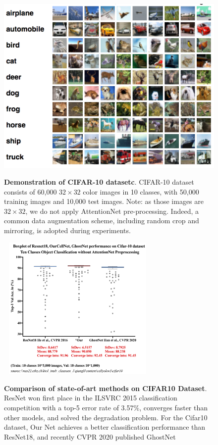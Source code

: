 \begin{figure}[ht]
\begin{center}
\includegraphics[height=0.3\textheight]{thesis-template-master/images/cifardataset.png}
\label{fig:cellnet}
\end{center}
\caption{\textbf{Demonstration of CIFAR-10 datasetc}. CIFAR-10 dataset\cite{21} consists of 60,000  $32 \times 32$ color images in 10 classes, with 50,000 training images and 10,000 test images. Note: as those images are  $32 \times 32$, we do not apply AttentionNet pre-processing. Indeed, a common data augmentation scheme, including random crop and mirroring, is adopted during experiments.}
\label{fig:4.13}
\end{figure}


\begin{figure}[t]
\begin{center}
\includegraphics[height=200pt,width=0.7\textwidth]{thesis-template-master/images/Cifar-12-06-2020.png}
\label{fig:cellnet}
\end{center}
\caption{\textbf{Comparison of state-of-art methods on CIFAR10 Dataset\cite{21}}.  ResNet\cite{20} won first place in the ILSVRC 2015 classification competition with a top-5 error rate of 3.57\%, converges faster than other models, and solved the degradation problem. For the Cifar10 dataset\cite{21}, Our Net achieves a better classification performance than ResNet18, and recently CVPR 2020 published GhostNet\cite{19}}
\label{fig:4.14}
\end{figure}


